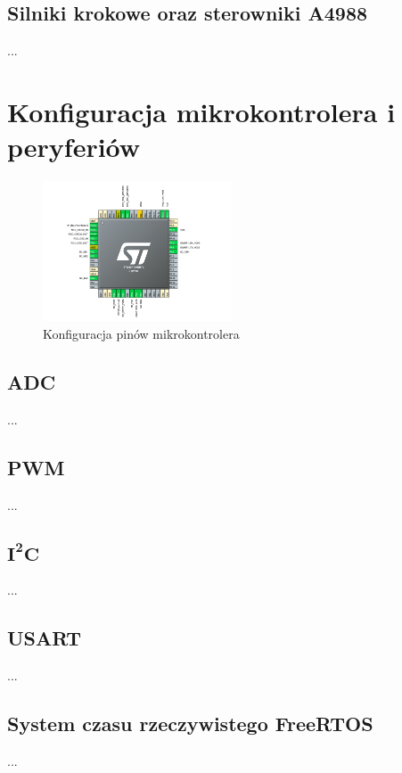 \subsection{Silniki krokowe oraz sterowniki A4988}
...

\section{Konfiguracja mikrokontrolera i peryferiów}

\begin{figure}[h!]
    \centering
    \includegraphics[width=0.5\textwidth]{Rysunki/Rozdzial05/Pinout.png}
    \caption{Konfiguracja pinów mikrokontrolera}
    \label{Piny}
\end{figure}

\subsection{ADC}
...

\subsection{PWM}
...

\subsection{$\mathbf{I^{2}C}$}
...

\subsection{USART}
...

\subsection{System czasu rzeczywistego FreeRTOS}
...

